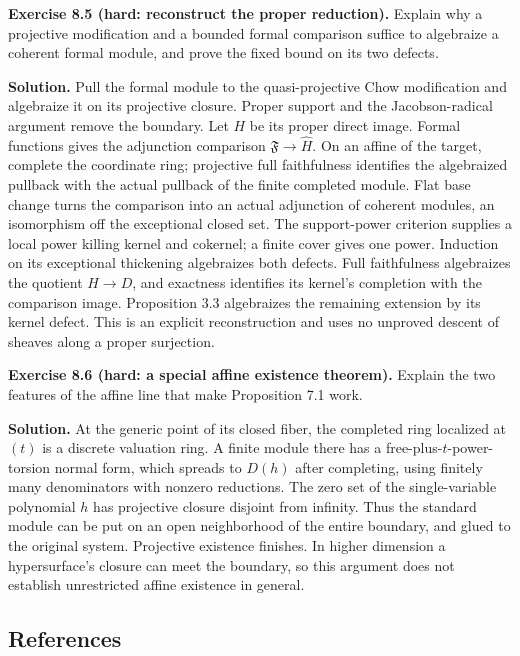 \documentclass[11pt]{article}
\begin{document}
\textbf{Exercise 8.5 (hard: reconstruct the proper reduction).} Explain
why a projective modification and a bounded formal comparison suffice to
algebraize a coherent formal module, and prove the fixed bound on its
two defects.

\textbf{Solution.} Pull the formal module to the quasi-projective Chow
modification and algebraize it on its projective closure. Proper support
and the Jacobson-radical argument remove the boundary. Let \(H\) be its
proper direct image. Formal functions gives the adjunction comparison
\(\mathfrak F\to\widehat H\). On an affine of the target, complete the
coordinate ring; projective full faithfulness identifies the algebraized
pullback with the actual pullback of the finite completed module. Flat
base change turns the comparison into an actual adjunction of coherent
modules, an isomorphism off the exceptional closed set. The
support-power criterion supplies a local power killing kernel and
cokernel; a finite cover gives one power. Induction on its exceptional
thickening algebraizes both defects. Full faithfulness algebraizes the
quotient \(H\to D\), and exactness identifies its kernel's completion
with the comparison image. Proposition 3.3 algebraizes the remaining
extension by its kernel defect. This is an explicit reconstruction and
uses no unproved descent of sheaves along a proper surjection.

\textbf{Exercise 8.6 (hard: a special affine existence theorem).}
Explain the two features of the affine line that make Proposition 7.1
work.

\textbf{Solution.} At the generic point of its closed fiber, the
completed ring localized at \((t)\) is a discrete valuation ring. A
finite module there has a free-plus-\(t\)-power-torsion normal form,
which spreads to \(D(h)\) after completing, using finitely many
denominators with nonzero reductions. The zero set of the
single-variable polynomial \(h\) has projective closure disjoint from
infinity. Thus the standard module can be put on an open neighborhood of
the entire boundary, and glued to the original system. Projective
existence finishes. In higher dimension a hypersurface's closure can
meet the boundary, so this argument does not establish unrestricted
affine existence in general.

\subsection{References}\label{references}
\end{document}
